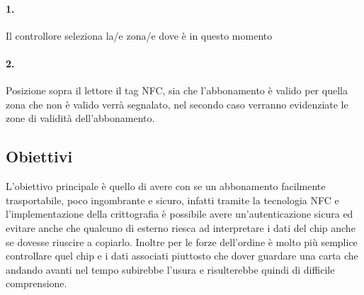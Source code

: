 \paragraph{1.} Il controllore seleziona la/e zona/e dove è in questo momento
\paragraph{2.} Posizione sopra il lettore il tag NFC, sia che l'abbonamento è valido per quella zona che non è valido verrà segnalato, nel secondo caso verranno evidenziate le zone di validità dell'abbonamento.

\subsection{Obiettivi}
L'obiettivo principale è quello di avere con se un abbonamento facilmente trasportabile, poco ingombrante e sicuro, infatti tramite la tecnologia NFC e l'implementazione della crittografia è possibile avere un'autenticazione sicura ed evitare anche che qualcuno di esterno riesca ad interpretare i dati del chip anche se dovesse riuscire a copiarlo. Inoltre per le forze dell'ordine è molto più semplice controllare quel chip e i dati associati piuttosto che dover guardare una carta che andando avanti nel tempo subirebbe l'usura e risulterebbe quindi di difficile comprensione.